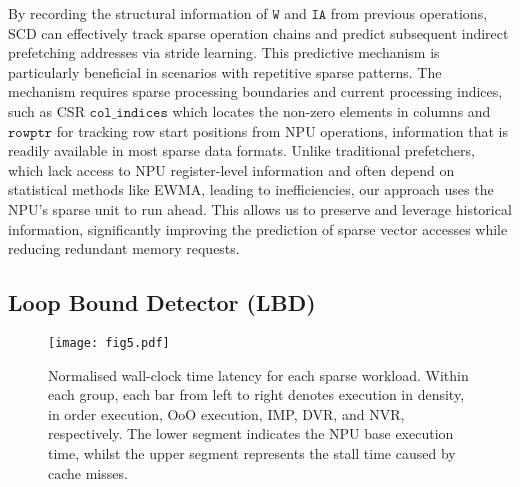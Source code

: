 By recording the structural information of ${\texttt{W}}$ and ${\texttt{IA}}$ from previous operations, SCD can effectively track sparse operation chains and predict subsequent indirect prefetching addresses via stride learning. 
This predictive mechanism is particularly beneficial in scenarios with repetitive sparse patterns.
The mechanism requires sparse processing boundaries and current processing indices, such as CSR $\texttt{col\_indices}$ which locates the non-zero elements in columns and $\texttt{rowptr}$ for tracking row start positions from NPU operations, information that is readily available in most sparse data formats.
Unlike traditional prefetchers, which lack access to NPU register-level information and often depend on statistical methods like EWMA\cite{crowder1992ewma}, leading to inefficiencies, our approach uses the NPU's sparse unit to run ahead. This allows us to preserve and leverage historical information, significantly improving the prediction of sparse vector accesses while reducing redundant memory requests.





\subsection{Loop Bound Detector (LBD)}
\vspace{-2pt}

\begin{figure*}[t]
\vspace{-7pt}
\hspace{-10pt}
\texttt{[image: fig5.pdf]}
\vspace{-5pt}
\caption{Normalised wall-clock time latency for each sparse workload. Within each group, each bar from left to right denotes execution in density, in order execution, OoO execution, IMP, DVR, and NVR, respectively. The lower segment indicates the NPU base execution time, whilst the upper segment represents the stall time caused by cache misses.}
\vspace{-15pt}
\label{fig:fig5}
\end{figure*}

